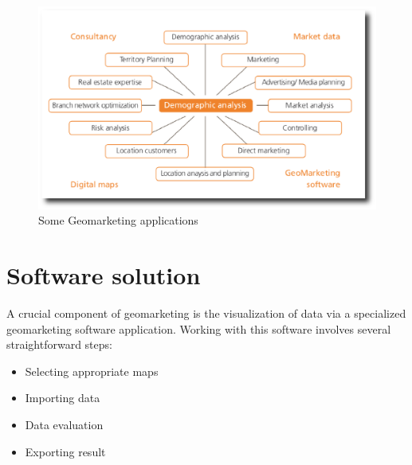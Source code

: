 \pagebreak

\begin{figure}[!htb]
  \begin{center}
  \includegraphics[scale=0.8]{Figures/Geomarketing_application.eps}
  \end{center}
  \caption{Some Geomarketing applications}
  \label{Some Geomarketing applications}
\end{figure}

\section{Software solution}
A crucial component of geomarketing is the visualization of data via a
specialized geomarketing software application. Working with this software
involves several straightforward steps:

\begin{itemize}
  \item Selecting appropriate maps
  \item Importing data
  \item Data evaluation
  \item Exporting result
\end{itemize}